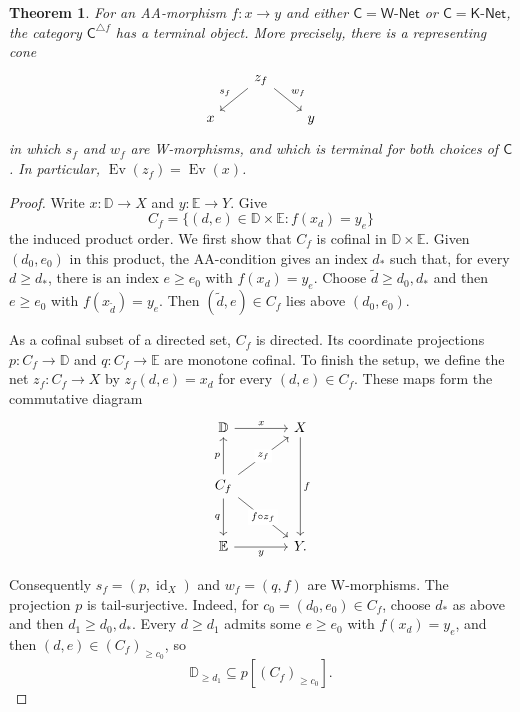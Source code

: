 \documentclass[11pt,a4paper]{article}
\newtheorem{theorem}{Theorem}[section]
\theoremstyle{definition}
\theoremstyle{remark}
\newcommand{\Wpar}{\mathsf{W\text{-}Net}}
\newcommand{\Kpar}{\mathsf{K\text{-}Net}}
\newcommand{\CC}{\mathsf C}
\newcommand{\Ev}{\operatorname{Ev}}
\newcommand{\id}{\operatorname{id}}
\begin{document}
\begin{theorem}\label{thm:graph}\label{prop:terminalroof}
For an AA-morphism \(f:x\to y\) and either \(\CC=\Wpar\)
or \(\CC=\Kpar\), the category \(\CC^{\triangle f}\) has a
terminal object. More precisely, there is a representing cone
\begin{equation}\label{eq:cone}
\begin{tikzcd}[column sep=2em,row sep=1.5em]
& z_f \arrow[dl,"s_f"'] \arrow[dr,"w_f"] & \\
x & & y
\end{tikzcd}
\end{equation}
in which \(s_f\) and \(w_f\) are W-morphisms, and which is
terminal for both choices of \(\CC\). In particular,
\(\Ev(z_f)=\Ev(x)\).
\end{theorem}
\begin{proof}
Write \(x:\mathbb D\to X\) and \(y:\mathbb E\to Y\). Give
\[
 C_f=\{(d,e)\in\mathbb D\times\mathbb E:f(x_d)=y_e\}
\]
the induced product order. We first show that \(C_f\) is cofinal
in \(\mathbb D\times\mathbb E\). Given \((d_0,e_0)\) in this product,
the AA-condition gives an index \(d_*\) such that, for every
\(d\ge d_*\), there is an index \(e\ge e_0\) with \(f(x_d)=y_e\).
Choose \(\tilde d\ge d_0,d_*\) and then \(e\ge e_0\) with
\(f(x_{\tilde d})=y_e\). Then \((\tilde d,e)\in C_f\) lies above
\((d_0,e_0)\).

As a cofinal subset of a directed set, \(C_f\) is directed. Its
coordinate projections \(p:C_f\to\mathbb D\) and
\(q:C_f\to\mathbb E\) are monotone cofinal. To finish the setup, we
define the net \(z_f:C_f\to X\) by \(z_f(d,e)=x_d\) for every
\((d,e)\in C_f\). These maps form the commutative diagram
\begin{equation}\label{eq:representationdiagram}
\begin{tikzcd}[column sep=large,row sep=large]
\mathbb D \arrow[r,"x"] & X \arrow[dd,"f"] \\
C_f \arrow[u,"p"] \arrow[d,"q"']
    \arrow[ur,"z_f" description]
    \arrow[dr,"f\circ z_f" description] & \\
\mathbb E \arrow[r,"y"'] & Y.
\end{tikzcd}
\end{equation}

Consequently \(s_f=(p,\id_X)\) and \(w_f=(q,f)\) are W-morphisms.
The projection \(p\) is tail-surjective. Indeed, for
\(c_0=(d_0,e_0)\in C_f\), choose \(d_*\) as above and then
\(d_1\ge d_0,d_*\). Every \(d\ge d_1\) admits some \(e\ge e_0\)
with \(f(x_d)=y_e\), and then \((d,e)\in(C_f)_{\ge c_0}\), so
\begin{equation}\label{eq:stronggraph}
 \mathbb D_{\ge d_1}\subseteq p[(C_f)_{\ge c_0}].
\end{equation}


\end{proof}
\end{document}
